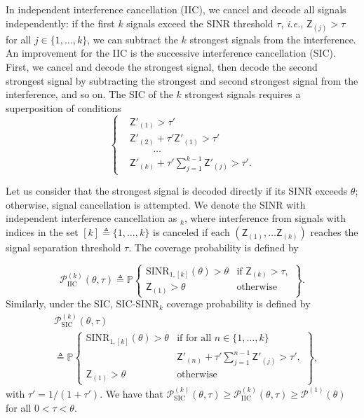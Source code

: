 \documentclass[lettersize,journal]{IEEEtran}
\begin{document}
In independent interference cancellation (IIC), we cancel and decode all signals independently: if the first $k$ signals exceed the SINR threshold $\tau$, \textit{i.e.}, $\mathsf{Z}_{(j)} > \tau$ for all $j \in \{1,\dots,k\}$, we can subtract the $k$ strongest signals from the interference. An improvement for the IIC is the successive interference cancellation (SIC). First, we cancel and decode the strongest signal, then decode the second strongest signal by subtracting the strongest and second strongest signal from the interference, and so on. The SIC of the $k$ strongest signals requires a superposition of conditions
\begin{equation}
  \label{eq:SIC-SINRcond}
  \begin{cases}
    &\mathsf{Z}'_{(1)} > \tau'\\
    & \mathsf{Z}'_{(2)} + \tau' \mathsf{Z}'_{(1)}> \tau' \\
    &\hspace{1cm}\dots \\
    &\mathsf{Z}'_{(k)} + \tau' \sum_{j=1}^{k-1}\mathsf{Z}'_{(j)}> \tau'.
  \end{cases}
\end{equation}



Let us consider that the strongest signal is decoded directly if its SINR exceeds $\theta$; otherwise, signal cancellation is attempted. We denote the SINR with independent interference cancellation as $_k$, where interference from signals with indices in the set $[k] \triangleq \{1, \dots, k\}$ is canceled if each $(\mathsf{Z}_{(1)}, \dots  \mathsf{Z}_{(k)})$ reaches the signal separation threshold $\tau$. The coverage probability is defined by


\begin{equation}
  \mathcal{P}^{(k)}_{\text{IIC}}(\theta,\tau) \triangleq \mathbb{P}\begin{Bmatrix} \text{SINR}_{1,[k]}(\theta)>\theta & \text{if } \mathsf{Z}_{(k)}>\tau, \\
\mathsf{Z}_{(1)}>\theta & \text{otherwise} \end{Bmatrix}.
\end{equation}
Similarly, under the SIC, SIC-SINR$_{k}$ coverage probability is defined by
\begin{align}
  \label{eq:SIC-SINRprob}
  &\mathcal{P}^{(k)}_{\text{SIC}}(\theta,\tau)  \nonumber\\
  &\triangleq \mathbb{P}\begin{Bmatrix} \text{SINR}_{1,[k]}(\theta)>\theta & \text{if for all }n\in\{1,\dots,k\}  \\
    & \mathsf{Z}'_{(n)}+\tau'\sum\limits_{j=1}^{n-1}\mathsf{Z}'_{(j)}>\tau',\\
\mathsf{Z}_{(1)}>\theta & \text{otherwise} \end{Bmatrix},
\end{align}
with $\tau'=1/(1+\tau')$. We have that $\mathcal{P}^{(k)}_{\text{SIC}}(\theta,\tau)\geq \mathcal{P}^{(k)}_{\text{IIC}}(\theta,\tau) \geq \mathcal{P}^{(1)}(\theta)$ for all $0<\tau < \theta$. 
\end{document}
